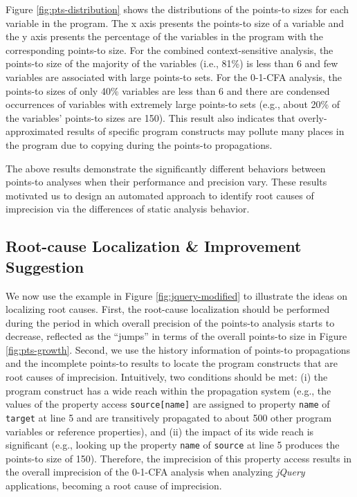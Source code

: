 Figure \ref{fig:pts-distribution} shows the distributions of the points-to sizes for each variable in the program. The x axis presents the points-to size of a variable and the y axis presents the percentage of the variables in the program with the corresponding points-to size. For the combined context-sensitive analysis, the points-to size of the majority of the variables (i.e., 81\%) is less than 6 and few variables are associated with large points-to sets. For the 0-1-CFA analysis, the points-to sizes of only 40\% variables are less than 6 and there are condensed occurrences of variables with extremely large points-to sets (e.g., about 20\% of the variables' points-to sizes are 150). This result also indicates that overly-approximated results of specific program constructs may pollute many places in the program due to copying during the points-to propagations.

The above results demonstrate the significantly different behaviors between points-to analyses when their performance and precision vary. These results motivated us to design an automated approach to identify root causes of imprecision via the differences of static analysis behavior. 

\subsection{Root-cause Localization \& Improvement Suggestion}

We now use the example in Figure \ref{fig:jquery-modified} to illustrate the ideas on localizing root causes. First, the root-cause localization should be performed during the period in which overall precision of the points-to analysis starts to decrease, reflected as the ``jumps'' in terms of the overall points-to size in Figure \ref{fig:pts-growth}. Second, we use the history information of points-to propagations and the incomplete points-to results to locate the program constructs that are root causes of imprecision. Intuitively, two conditions should be met: (i) the program construct has a wide reach within the propagation system (e.g., the values of the property access {\tt source[name]} are assigned to property {\tt name} of {\tt target} at line 5 and are transitively propagated to about 500 other program variables or reference properties), and (ii) the impact of its wide reach is significant (e.g., looking up the property {\tt name} of {\tt source} at line 5 produces the points-to size of 150). Therefore, the imprecision of this property access results in the overall imprecision of the 0-1-CFA analysis when analyzing {\it jQuery} applications, becoming a root cause of imprecision.

